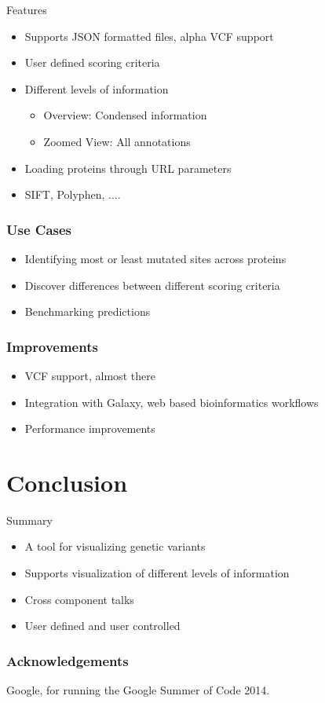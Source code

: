 \documentclass[10pt, compress]{beamer}
\renewcommand{\(}{\begin{columns}}
\renewcommand{\)}{\end{columns}}
\newcommand{\<}[1]{\begin{column}{#1}}
\renewcommand{\>}{\end{column}}
\begin{document}
\begin{frame}{Features}
\begin{itemize}
\item Supports JSON formatted files, alpha VCF support
\item User defined scoring criteria
\item Different levels of information
\begin{itemize}
\item Overview: Condensed information
\item Zoomed View: All annotations 
\end{itemize}
\item Loading proteins through URL parameters
\item SIFT, Polyphen, ....

\end{itemize}
\end{frame}

\begin{frame}
\frametitle{Use Cases}
\begin{itemize}
\item Identifying most or least mutated sites across proteins
\item Discover differences between different scoring criteria
\item Benchmarking predictions
\end{itemize}

\end{frame}

\begin{frame}
\frametitle{Improvements}
\begin{itemize}[<+- | alert@+>]
\item VCF support, almost there
\item Integration with Galaxy, web based bioinformatics workflows
\item Performance improvements
\end{itemize}
\end{frame}

\section{Conclusion}

\begin{frame}{Summary}
\begin{itemize}
\item A tool for visualizing genetic variants
\item Supports visualization of different levels of information
\item Cross component talks
\item User defined and user controlled

\end{itemize}

\end{frame}

\begin{frame}
\frametitle{Acknowledgements}
Google, for running the Google Summer of Code 2014.
\end{frame}

\end{document}

